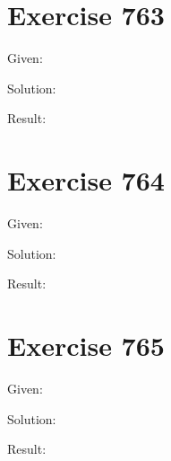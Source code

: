 \documentclass[a4paper, 10pt]{scrartcl}
\begin{document}
\section{Exercise 763}

Given:

Solution:

Result:

\section{Exercise 764}

Given:

Solution:

Result:

\section{Exercise 765}

Given:

Solution:

Result:
\end{document}
